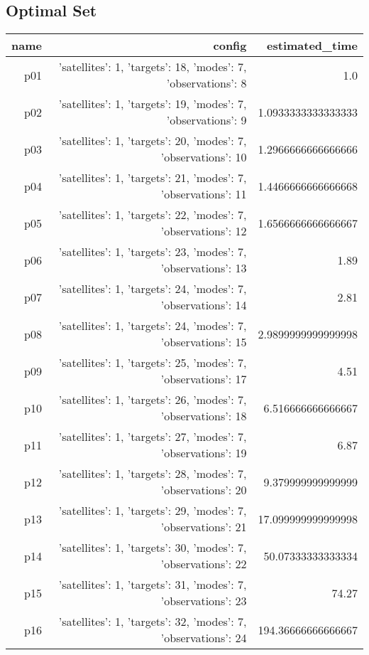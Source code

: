 \documentclass{article}
\begin{document}
                                \subsection*{Optimal Set}
                                
                            \begin{center}
                            \scriptsize
                            \begin{tabular}{r|r|r}
                            name & config & estimated\_time\\\midrule
                              p01&{'satellites': 1, 'targets': 18, 'modes': 7, 'observations': 8}&1.0\\
  p02&{'satellites': 1, 'targets': 19, 'modes': 7, 'observations': 9}&1.0933333333333333\\
  p03&{'satellites': 1, 'targets': 20, 'modes': 7, 'observations': 10}&1.2966666666666666\\
  p04&{'satellites': 1, 'targets': 21, 'modes': 7, 'observations': 11}&1.4466666666666668\\
  p05&{'satellites': 1, 'targets': 22, 'modes': 7, 'observations': 12}&1.6566666666666667\\
  p06&{'satellites': 1, 'targets': 23, 'modes': 7, 'observations': 13}&1.89\\
  p07&{'satellites': 1, 'targets': 24, 'modes': 7, 'observations': 14}&2.81\\
  p08&{'satellites': 1, 'targets': 24, 'modes': 7, 'observations': 15}&2.9899999999999998\\
  p09&{'satellites': 1, 'targets': 25, 'modes': 7, 'observations': 17}&4.51\\
  p10&{'satellites': 1, 'targets': 26, 'modes': 7, 'observations': 18}&6.516666666666667\\
  p11&{'satellites': 1, 'targets': 27, 'modes': 7, 'observations': 19}&6.87\\
  p12&{'satellites': 1, 'targets': 28, 'modes': 7, 'observations': 20}&9.379999999999999\\
  p13&{'satellites': 1, 'targets': 29, 'modes': 7, 'observations': 21}&17.099999999999998\\
  p14&{'satellites': 1, 'targets': 30, 'modes': 7, 'observations': 22}&50.07333333333334\\
  p15&{'satellites': 1, 'targets': 31, 'modes': 7, 'observations': 23}&74.27\\
  p16&{'satellites': 1, 'targets': 32, 'modes': 7, 'observations': 24}&194.36666666666667\\

\end{tabular}
\end{center}
\end{document}
